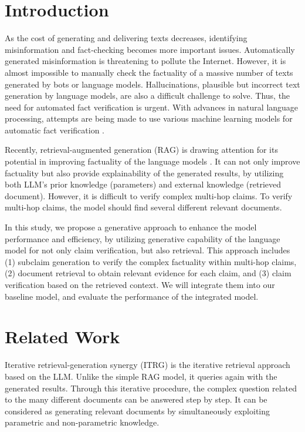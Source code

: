 \documentclass{article}
\begin{document}
\section{Introduction}
As the cost of generating and delivering texts decreases, identifying misinformation and fact-checking becomes more important issues. Automatically generated misinformation is threatening to pollute the Internet. However, it is almost impossible to manually check the factuality of a massive number of texts generated by bots or language models. Hallucinations, plausible but incorrect text generation by language models, are also a difficult challenge to solve. Thus, the need for automated fact verification is urgent. With advances in natural language processing, attempts are being made to use various machine learning models for automatic fact verification \cite{chopra2017towards,zhong2019reasoning,nie2019combining}.\par
Recently, retrieval-augmented generation (RAG) \cite{lewis2020retrieval,izacard2020leveraging} is drawing attention for its potential in improving factuality of the language models \cite{shuster2021retrieval,ren2023investigating}. It can not only improve factuality but also provide explainability of the generated results, by utilizing both LLM's prior knowledge (parameters) and external knowledge (retrieved document). However, it is difficult to verify complex multi-hop claims. To verify multi-hop claims, the model should find several different relevant documents.\par
In this study, we propose a generative approach to enhance the model performance and efficiency, by utilizing generative capability of the language model for not only claim verification, but also retrieval. This approach includes (1) subclaim generation to verify the complex factuality within multi-hop claims, (2) document retrieval to obtain relevant evidence for each claim, and (3) claim verification based on the retrieved context. We will integrate them into our baseline model, and evaluate the performance of the integrated model.

\section{Related Work}

Iterative retrieval-generation synergy (ITRG) \cite{feng2023retrieval} is the iterative retrieval approach based on the LLM. Unlike the simple RAG model, it queries again with the generated results. Through this iterative procedure, the complex question related to the many different documents can be answered step by step. It can be considered as generating relevant documents by simultaneously exploiting parametric and non-parametric knowledge.
\end{document}

